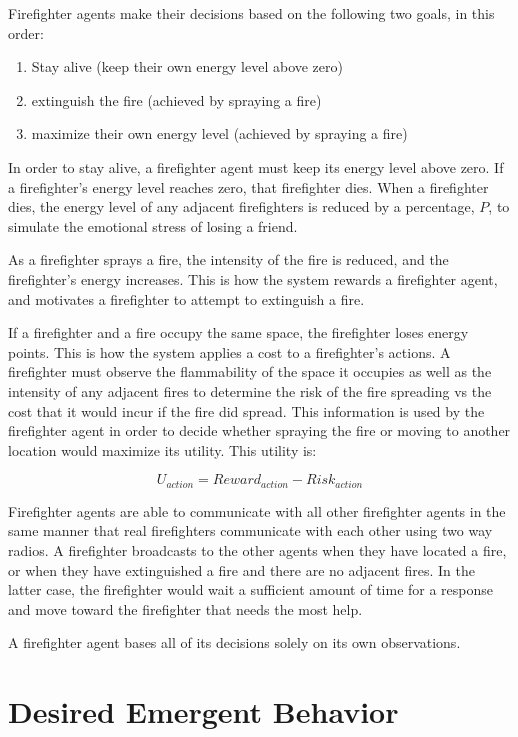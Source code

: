 \documentclass{article}
\begin{document}
Firefighter agents make their decisions based on the following two goals,
in this order:

\begin{enumerate}
  \item Stay alive (keep their own energy level above zero)
  \item extinguish the fire (achieved by spraying a fire)
  \item maximize their own energy level (achieved by spraying a fire)
\end{enumerate}

In order to stay alive, a firefighter agent must keep its energy level above
zero.  If a firefighter's energy level reaches zero, that firefighter dies.
When a firefighter dies, the energy level of any adjacent firefighters is
reduced by a percentage, $P$, to simulate the emotional stress of losing a
friend.

As a firefighter sprays a fire, the intensity of the fire is reduced, and the
firefighter's energy increases.  This is how the system rewards a firefighter
agent, and motivates a firefighter to attempt to extinguish a fire.

If a firefighter and a fire occupy the same space, the firefighter loses
energy points.  This is how the system applies a cost to a firefighter's
actions.  A firefighter must observe the flammability of the space it occupies
as well as the intensity of any adjacent fires to determine the risk of the
fire spreading vs the cost that it would incur if the fire did spread.  This
information is used by the firefighter agent in order to decide whether
spraying the fire or moving to another location would maximize its utility.
This utility is:

\[ U_{action} = Reward_{action} - Risk_{action} \]

Firefighter agents are able to communicate with all other firefighter agents
in the same manner that real firefighters communicate with each other using
two way radios.  A firefighter broadcasts to the other agents when they have
located a fire, or when they have extinguished a fire and there are no adjacent
fires.  In the latter case, the firefighter would wait a sufficient amount of
time for a response and move toward the firefighter that needs the most help.

A firefighter agent bases all of its decisions solely on its own observations.

\section{Desired Emergent Behavior}
\end{document}
